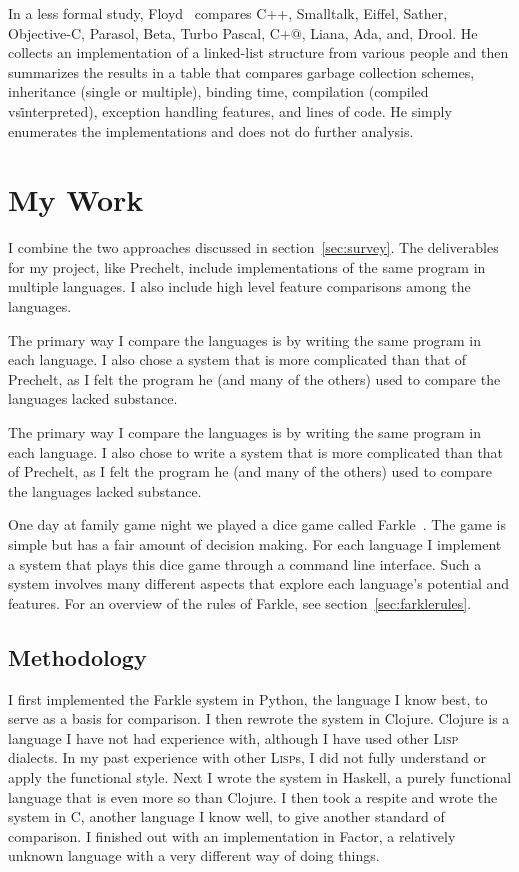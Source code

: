 \documentclass{article}
\begin{document}
In a less formal study, Floyd~\cite{DDJFloydeCompOOLangs} compares C++,
Smalltalk, Eiffel, Sather, Objective-C, Parasol, Beta, Turbo Pascal, C+@,
Liana, Ada, and, Drool.  He collects an implementation of a linked-list
structure from various people and then summarizes the results in a table that
compares garbage collection schemes, inheritance (single or multiple), binding
time, compilation (compiled vs\. interpreted), exception handling features, and
lines of code.  He simply enumerates the implementations and does not do
further analysis.

\section{My Work}

I combine the two approaches discussed in section~\ref{sec:survey}.  The
deliverables for my project, like Prechelt, include implementations of the same
program in multiple languages. I also include high level feature comparisons
among the languages.

The primary way I compare the languages is by writing the same program in each
language.  I also chose a system that is more complicated than that of Prechelt,
as I felt the program he (and many of the others) used to compare the languages
lacked substance.

The primary way I compare the languages is by writing the same program in each
language.  I also chose to write a system that is more complicated than that of Prechelt,
as I felt the program he (and many of the others) used to compare the languages
lacked substance.

One day at family game night we played a dice game called
Farkle~\cite{farklewikipedia}.  The game is simple but has a fair amount of
decision making.  For each language I implement a system that plays
this dice game through a command line interface.  Such a system involves many
different aspects that explore each language's potential and features.  For an
overview of the rules of Farkle, see section~\ref{sec:farklerules}.

\subsection{Methodology}

I first implemented the Farkle system in Python, the language I know
best, to serve as a basis for comparison.  I then rewrote the system in Clojure.
Clojure is a language I have not had experience with, although I have used other
\textsc{Lisp} dialects.  In my past experience with other \textsc{Lisp}s, I did not
fully understand or apply the functional style.  Next I wrote the system in
Haskell, a purely functional language that is even more so than Clojure.  I
then took a respite and wrote the system in C, another language I know well, to
give another standard of comparison.  I finished out with an implementation in
Factor, a relatively unknown language with a very different way of doing things.
\end{document}
